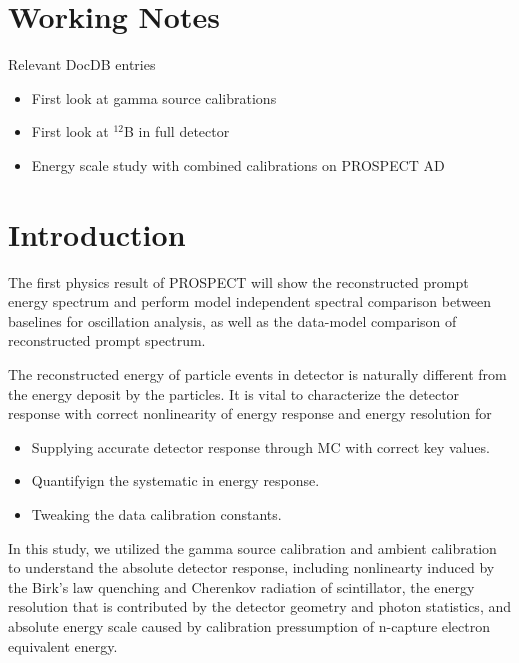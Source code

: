 




\newpage
\tableofcontents{}

\newpage
\section*{Working Notes}

Relevant DocDB entries
\begin{itemize}

\item First look at gamma source calibrations

\item First look at $^{12}$B in full detector

\item Energy scale study with combined calibrations on PROSPECT AD



\end{itemize}

\newpage

\section{Introduction}
\label{sec:intro}
The first physics result of PROSPECT will show the reconstructed prompt energy spectrum and perform model independent spectral comparison between baselines for oscillation analysis, as well as the data-model comparison of reconstructed prompt spectrum.

The reconstructed energy of particle events in detector is naturally different from the energy deposit by the particles. It is vital to characterize the detector response with correct  nonlinearity of energy response and energy resolution for
\begin{itemize}
    \item Supplying accurate detector response through MC with correct key values.
    \item Quantifyign the systematic in energy response. 
    \item Tweaking the data calibration constants.
\end{itemize}

In this study, we utilized the gamma source calibration and ambient calibration to understand the absolute detector response, including nonlinearty induced by the Birk's law quenching and Cherenkov radiation of scintillator, the energy resolution that is contributed by the detector geometry and photon statistics, and absolute energy scale caused by calibration pressumption of n-capture electron equivalent energy.

